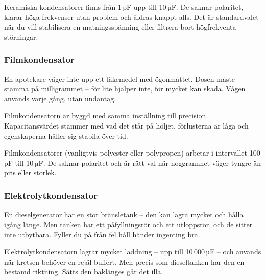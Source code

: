 \documentclass[a4paper,11pt,twoside]{book}
\newcommand{\emoji}[1]{{\emojifont #1}}
\begin{document}
Keramiska kondensatorer finns från 1\,pF upp till 10\,µF. 
De saknar polaritet, klarar höga frekvenser utan problem 
och åldras knappt alls. Det är standardvalet när du vill 
stabilisera en matningsspänning eller filtrera bort 
högfrekventa störningar.

\subsubsection*{Filmkondensator}

\begin{storybox}[{\emoji{⚗️} Apotekaren}]
En apotekare väger inte upp ett läkemedel med ögonmåttet. 
Dosen måste stämma på milligrammet -- för lite hjälper 
inte, för mycket kan skada. Vågen används varje gång, 
utan undantag.

Filmkondensatorn är byggd med samma inställning till 
precision. Kapacitansvärdet stämmer med vad det står på 
höljet, förlusterna är låga och egenskaperna håller sig 
stabila över tid.
\end{storybox}

Filmkondensatorer (vanligtvis polyester eller polypropen) 
arbetar i intervallet 100\,pF till 10\,µF. De saknar 
polaritet och är rätt val när noggrannhet väger tyngre 
än pris eller storlek.

\subsubsection*{Elektrolytkondensator}

\begin{storybox}[{\emoji{🔋} Stora tanken}]
En dieselgenerator har en stor bränsletank -- den kan 
lagra mycket och hålla igång länge. Men tanken har ett 
påfyllningsrör och ett utloppsrör, och de sitter inte 
utbytbara. Fyller du på från fel håll händer ingenting bra.

Elektrolytkondensatorn lagrar mycket laddning -- upp till 
10\,000\,µF -- och används när kretsen behöver en rejäl 
buffert. Men precis som dieseltanken har den en bestämd 
riktning. Sätts den baklänges går det illa.
\end{storybox}
\end{document}

